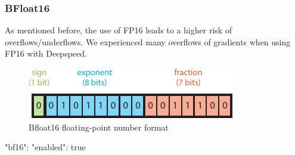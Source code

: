 \subsubsection{BFloat16}

As mentioned before, the use of FP16 leads to a higher risk of overflows/underflows. We experienced many overflows 
of gradients when using FP16 with Deepspeed. 

\begin{figure}[H]
    \centering
    \includegraphics{figures/mixed_precision/bfloat16.pdf}
    \caption{Bfloat16 floating-point number format}
\end{figure}

\begin{json}[language=json,firstnumber=1]
"bf16": {
    "enabled": true
}
\end{json}





